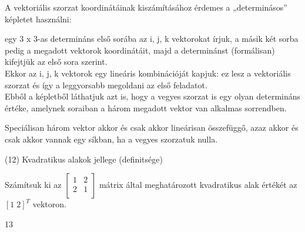 \begin{frame}
  \begin{tcolorbox}[title={Megoldások {\symking}}]
    A vektoriális szorzat koordinátáinak kiszámításához érdemes a „determinásos” képletet használni:\\
    \mmedskip
    
    egy 3 x 3-as determináns első sorába az i, j, k vektorokat írjuk, a másik két sorba pedig a megadott vektorok koordinátáit, majd a determinánst (formálisan) kifejtjük az első sora szerint.\\
    Ekkor az i, j, k vektorok egy lineáris kombinációját kapjuk: ez lesz a vektoriális szorzat és így a leggyorsabb megoldani az első feladatot.\\
    Ebből a képletből láthatjuk azt is, hogy a vegyes szorzat is egy olyan determináns értéke, amelynek soraiban a három megadott vektor van alkalmas sorrendben.\\
    \mmedskip
    
    Speciálisan három vektor akkor és csak akkor lineárisan összefüggő, azaz akkor és csak akkor vannak egy síkban, ha a vegyes szorzatuk nulla. 
  \end{tcolorbox}
\end{frame}


\begin{frame}[plain]
\begin{tcolorbox}[center, colback={myyellow}, coltext={black}, colframe={myyellow}]
    {\RHuge  (12) Kvadratikus alakok jellege (definitsége)}
    \mmedskip
\end{tcolorbox}
\end{frame}

\begin{frame}
  \begin{tcolorbox}[title={12/1. {\symknight}}]
     Számítsuk ki az $\begin{bmatrix} 
  				1 & 2 \\
  				2 & 1 \\
			\end{bmatrix}$ mátrix által meghatározott kvadratikus alak értékét az $[1 \; 2]^T$ vektoron.

  \tcblower

    \mmedskip 
    
    13
  \end{tcolorbox}
\end{frame}


